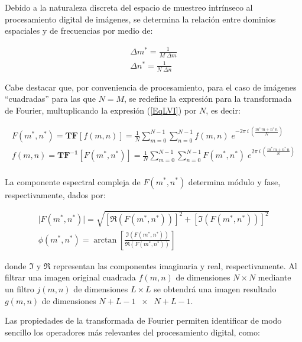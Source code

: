 Debido a la naturaleza discreta del espacio de muestreo intr\'inseco al procesamiento digital de im\'agenes, se determina la relaci\'on entre dominios
espaciales y de frecuencias por medio de:

\begin{eqnarray}
	\Delta m^* = \frac{1}{M\; \Delta m}  \\
	\Delta n^* = \frac{1}{N\; \Delta n}
\label{EqLVII}
\end{eqnarray}

Cabe destacar que, por conveniencia de procesamiento, para el caso de im\'agenes ``cuadradas'' para las que $N = M$, se redefine la expresi\'on para la
transformada de Fourier, multuplicando la expresi\'on (\ref{EqLVI}) por $N$, es decir:

\begin{eqnarray}
	F(m^*, n^*) = \mathbf{TF}[f(m, n)] = \frac{1}{N} \sum_{m=0}^{N-1} \sum_{n=0}^{N-1} f(m, n) \;
	e^{-2 \pi \, i \, \left( \frac{m^* \, m + n^* \, n}{N} \right)} \nonumber \\
	f(m, n) = \mathbf{TF^{-1}} [F(m^*, n^*)] = \frac{1}{N} \sum_{m=0}^{N-1} \sum_{n=0}^{N-1} F(m^*, n^*) \;
	e^{2 \pi \, i \, \left( \frac{m^* \, m + n^* \, n}{N} \right)} \nonumber \\
\label{EqLVIII}
\end{eqnarray}

La componente espectral compleja de $F(m^*, n^*)$ determina m\'odulo y fase, respectivamente, dados por:

\begin{eqnarray}
	\lvert F(m^*, n^*) \rvert = \sqrt{\left[ \Re{ \left( F(m^*, n^*) \right) }\right]^{2} +
	\left[ \Im{\left( F(m^*, n^*) \right) } \right]^{2}} \nonumber \\
	\phi(m^*, n^*) = \arctan \left[ \frac{\Im{\left( F(m^*, n^*) \right) }}{\Re{\left( F(m^*, n^*) \right) }}\right]
\label{EqLIX}
\end{eqnarray}

donde $\Im$ y $\Re$ representan las componentes imaginaria y real, respectivamente.
%
Al filtrar una imagen original cuadrada $f(m, n)$ de dimensiones $N \times N$ mediante un filtro $j(m, n)$ de dimensiones $L \times L$ se obtendr\'a una
imagen resultado $g(m, n)$ de dimensiones $N + L -1 \; \; \times \; \; N + L -1$.
%

%
Las propiedades de la transformada de Fourier permiten identificar de modo sencillo los operadores m\'as relevantes del procesamiento digital, como:
%

\vspace{1.0cm}

